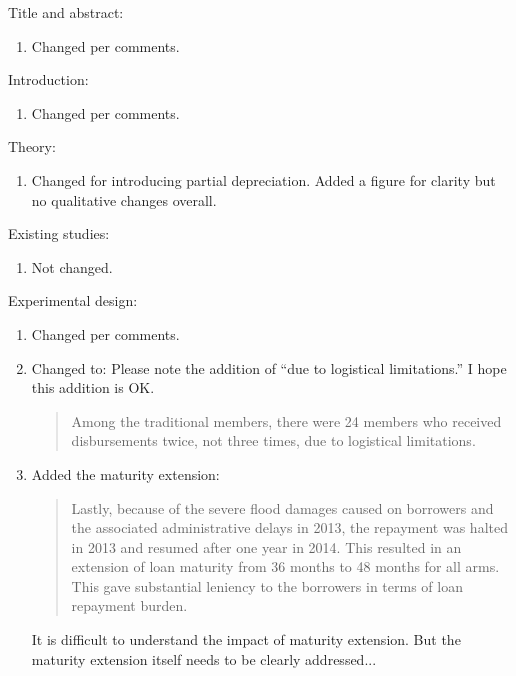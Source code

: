\vspace{2ex}
Title and abstract:
\begin{enumerate}
\vspace{1.0ex}\setlength{\itemsep}{1.0ex}\setlength{\baselineskip}{12pt}
\item	Changed per comments.
\end{enumerate}
Introduction:
\begin{enumerate}
\vspace{1.0ex}\setlength{\itemsep}{1.0ex}\setlength{\baselineskip}{12pt}
\item	Changed per comments.
\end{enumerate}
Theory:
\begin{enumerate}
\vspace{1.0ex}\setlength{\itemsep}{1.0ex}\setlength{\baselineskip}{12pt}
\item	Changed for introducing partial depreciation. Added a figure for clarity but no qualitative changes overall.
\end{enumerate}
Existing studies:
\begin{enumerate}
\vspace{1.0ex}\setlength{\itemsep}{1.0ex}\setlength{\baselineskip}{12pt}
\item	Not changed.
\end{enumerate}
Experimental design:
\begin{enumerate}
\vspace{1.0ex}\setlength{\itemsep}{1.0ex}\setlength{\baselineskip}{12pt}
\item	Changed per comments.
\item	Changed to: Please note the addition of ``due to logistical limitations.'' I hope this addition is OK.
\begin{quotation}
Among the \textsf{traditional} members, there were 24 members who received disbursements twice, not three times, due to logistical limitations.
\end{quotation}
\item	Added the maturity extension:
\begin{quotation}
	Lastly, because of the severe flood damages caused on borrowers and the associated administrative delays in 2013, the repayment was halted in 2013 and resumed after one year in 2014. This resulted in an extension of loan maturity from 36 months to 48 months for all arms. This gave substantial leniency to the borrowers in terms of loan repayment burden. 
\end{quotation}
It is difficult to understand the impact of maturity extension. But the maturity extension itself needs to be clearly addressed...
\end{enumerate}
